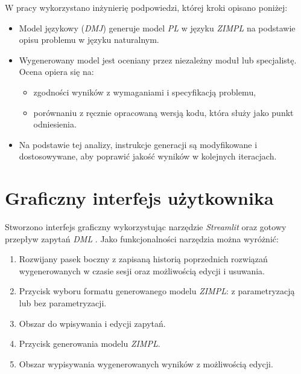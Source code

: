 W pracy wykorzystano inżynierię podpowiedzi, której kroki opisano poniżej:
\begin{itemize} 
\item Model językowy (\textit{DMJ}) generuje model \textit{PL} w języku \textit{ZIMPL} na podstawie opisu problemu w języku naturalnym. 
\item Wygenerowany model jest oceniany przez niezależny moduł lub specjalistę. Ocena opiera się na: 
    \begin{itemize} 
        \item zgodności wyników z wymaganiami i specyfikacją problemu, 
        \item porównaniu z ręcznie opracowaną wersją kodu, która służy jako punkt odniesienia. 
    \end{itemize} 
\item Na podstawie tej analizy, instrukcje generacji są modyfikowane i dostosowywane, aby poprawić jakość wyników w kolejnych iteracjach.\end{itemize}


\section{Graficzny interfejs użytkownika}\label{sec:generation:gui}

Stworzono interfejs graficzny wykorzystując narzędzie \textit{Streamlit} \cite{Streamlit2019} oraz gotowy przepływ zapytań \textit{DML} \cite{TODO}. Jako funkcjonalności narzędzia można wyróżnić:

\begin{enumerate}
\item Rozwijany pasek boczny z zapisaną historią poprzednich rozwiązań wygenerowanych w czasie sesji oraz możliwością edycji i usuwania.
\item Przycisk wyboru formatu generowanego modelu \textit{ZIMPL}: z parametryzacją lub bez parametryzacji.
\item Obszar do wpisywania i edycji zapytań.
\item Przycisk generowania modelu \textit{ZIMPL}.
\item Obszar wypisywania wygenerowanych wyników z możliwością edycji.
\end{enumerate}

